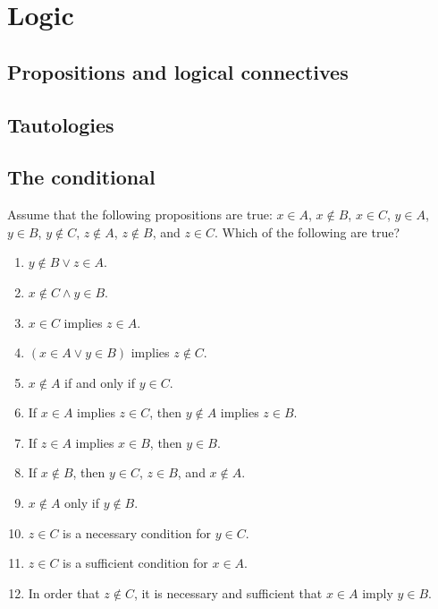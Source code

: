 \chapter{Logic}
\section{Propositions and logical connectives}
\section{Tautologies}
\section{The conditional}
\begin{exercise}
Assume that the following propositions are true: $x\in A$, $x\nin B$, $x\in C$, $y\in A$,
$y\in B$, $y\nin C$, $z\nin A$, $z\nin B$, and $z\in C$. Which of the following are true?
\begin{enumerate}[label=(\alph*)]
    \item $y\nin B\lor z\in A$.
    \item $x\nin C\land y\in B$.
    \item $x\in C$ implies $z\in A$.
    \item $(x\in A\lor y\in B)$ implies $z\nin C$.
    \item $x\nin A$ if and only if $y\in C$.
    \item If $x\in A$ implies $z\in C$, then $y\nin A$ implies $z\in B$.
    \item If $z\in A$ implies $x\in B$, then $y\in B$.
    \item If $x\nin B$, then $y\in C$, $z\in B$, and $x\nin A$.
    \item $x\nin A$ only if $y\nin B$.
    \item $z\in C$ is a necessary condition for $y\in C$.
    \item $z\in C$ is a sufficient condition for $x\in A$.
    \item In order that $z\nin C$, it is necessary and sufficient that $x\in A$ imply $y\in B$.
\end{enumerate}
\end{exercise}

